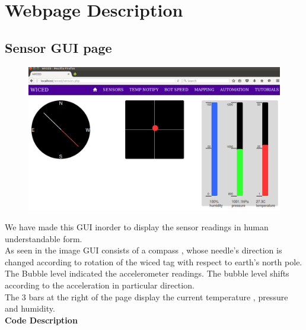 \documentclass[a4paper,12pt,oneside]{book}
\begin{document}
\newpage
\section{Webpage Description}

\subsection{Sensor GUI page}

\begin{figure}[h]
        \centering
    	\includegraphics[scale=0.2]{sensor.png}
	    \end{figure}
	    
	    \hspace{5mm}We have made this GUI inorder to display the sensor readings in human understandable form.\\ As seen in the image GUI consists of a compass , whose needle's direction is changed according to rotation of the wiced tag with respect to earth's north pole.
        \\The Bubble level indicated the accelerometer readings. The bubble level shifts according to the acceleration in particular direction.
        \\The 3 bars at the right of the page display the current temperature , pressure and humidity.\\

        \textbf{Code Description}
        
\end{document}
